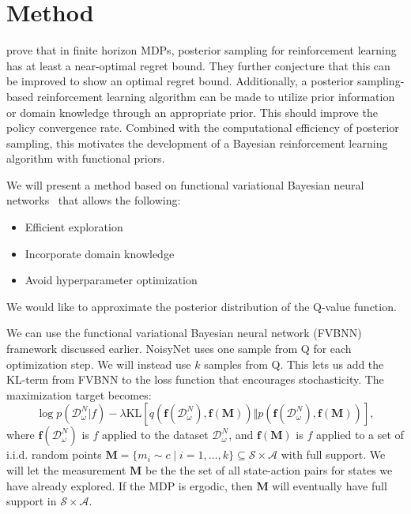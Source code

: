 \documentclass[]{uai2022} %
\newcommand{\D}{\mathcal{D}}
\newcommand{\f}{\mathbf{f}}
\newcommand{\state}{\mathcal{S}}
\newcommand{\action}{\mathcal{A}}
\newcommand{\KL}{\mathrm{KL}}
\begin{document}
\section{Method}

\citet{osband_why_2017} prove that in finite horizon MDPs, posterior sampling for
reinforcement learning has at least a near-optimal regret bound. They further conjecture
that this can be improved to show an optimal regret bound. Additionally,
a posterior sampling-based reinforcement learning algorithm can be made to utilize
prior information or domain knowledge through an appropriate prior. This should improve
the policy convergence rate.
Combined with the computational efficiency of posterior sampling, this motivates the
development of a Bayesian reinforcement learning algorithm with functional priors.

We will present a method based on functional variational Bayesian neural
networks~\citep{sun_functional_2019} that allows the following:

\begin{itemize}
    \item Efficient exploration
    \item Incorporate domain knowledge
    \item Avoid hyperparameter optimization
\end{itemize}

We would like to approximate the posterior distribution of the Q-value function.


We can use the functional variational Bayesian neural
network (FVBNN)~\citep{sun_functional_2019} framework discussed earlier.
NoisyNet uses one sample from Q for each optimization step. We will instead use
\(k\) samples from Q. This lets us add the KL-term from FVBNN to the loss function that
encourages stochasticity.
The maximization target becomes:
\begin{equation}
    \log p(\D_\omega^N \vert f) - \lambda \KL \left[ q(\f(\D_\omega^N), \f(\mathbf{M})) \Vert p(\f({\D_\omega^N}), \f(\mathbf{M})) \right],
\end{equation}
where \(\f({\D_\omega^N})\) is \(f\) applied to the dataset \(\D_\omega^N\), and \(\f(\mathbf{M})\) is \(f\) applied to
a set of i.i.d. random points \(\mathbf{M} = \{m_i \sim c \mid i=1,\dots,k\} \subseteq \state \times \action\)
with full support. We will let the measurement \(\mathbf{M}\) be the the set of all state-action
pairs for states we have already explored. If the MDP is ergodic, then \(\textbf{M}\) will eventually
have full support in \(\state \times \action\).
\end{document}
